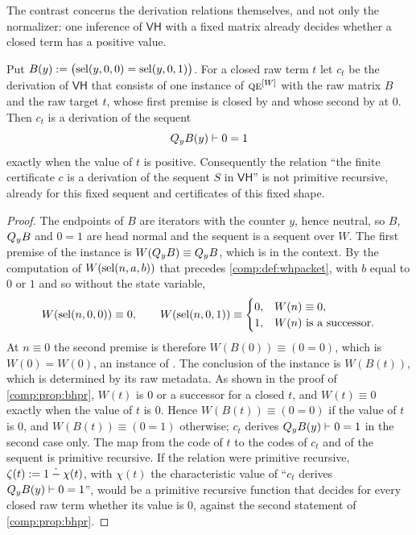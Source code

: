 The contrast concerns the derivation relations themselves, and not only the
normalizer: one inference of $\mathsf{VH}$ with a fixed matrix already
decides whether a closed term has a positive value.

\begin{proposition}
\label{comp:prop:vhnotpr}
Put $B(y)\mathrel{:=}\bigl(\operatorname{sel}(y,0,0)=\operatorname{sel}(y,0,1)\bigr)$. For a closed raw term
$t$ let $c_t$ be the derivation of $\mathsf{VH}$ that consists of one
instance of $\rulename{QE}^{[W]}$ with the raw matrix $B$ and the raw target
$t$, whose first premise is closed by  and whose second by
 at $0$. Then $c_t$ is a derivation of the sequent
\[
 Q_{y}B(y)\vdash0=1
\]
exactly when the value of $t$ is positive. Consequently the relation ``the
finite certificate $c$ is a derivation of the sequent $S$ in $\mathsf{VH}$''
is not primitive recursive, already for this fixed sequent and certificates
of this fixed shape.
\end{proposition}

\begin{proof}
The endpoints of $B$ are iterators with the counter $y$, hence neutral, so
$B$, $Q_{y}B$ and $0=1$ are head normal and the sequent is a sequent over
$W$. The first premise of the instance is $W(Q_{y}B)\equiv Q_{y}B$, which is
in the context. By the computation of $W(\operatorname{sel}(n,a,b))$ that precedes
\cref{comp:def:whpacket}, with $b$ equal to $0$ or $1$ and so without the
state variable,
\[
 W(\operatorname{sel}(n,0,0))\equiv0,\qquad
 W(\operatorname{sel}(n,0,1))\equiv
 \begin{cases}
  0, & W(n)\equiv0,\\
  1, & W(n)\text{ is a successor}.
 \end{cases}
\]
At $n\equiv0$ the second premise is therefore $W(B(0))\equiv(0=0)$, which is
$W(0)=W(0)$, an instance of . The conclusion of the instance
is $W(B(t))$, which is determined by its raw metadata. As shown in the proof
of \cref{comp:prop:bhpr}, $W(t)$ is $0$ or a successor for a closed $t$, and
$W(t)\equiv0$ exactly when the value of $t$ is $0$. Hence $W(B(t))\equiv(0=0)$
if the value of $t$ is $0$, and $W(B(t))\equiv(0=1)$ otherwise; $c_t$ derives
$Q_{y}B(y)\vdash0=1$ in the second case only. The map from the code of $t$
to the codes of $c_t$ and of the sequent is primitive recursive. If the
relation were primitive recursive, $\zeta(t)\mathrel{:=}1\mathbin{\dot-}\chi(t)$,
with $\chi(t)$ the characteristic value of ``$c_t$ derives
$Q_{y}B(y)\vdash0=1$'', would be a primitive recursive function that
decides for every closed raw term whether its value is $0$, against the
second statement of \cref{comp:prop:bhpr}.
\end{proof}

